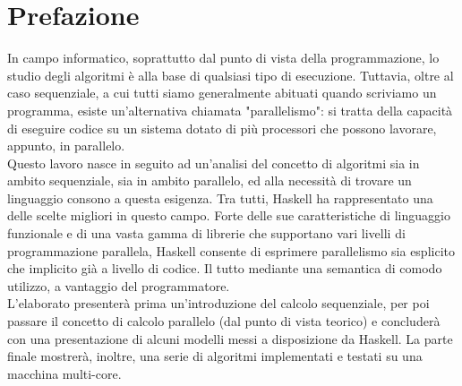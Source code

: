 \chapter*{Prefazione}
In campo informatico, soprattutto dal punto di vista della programmazione, lo studio degli algoritmi è alla base di qualsiasi tipo di esecuzione. Tuttavia, oltre al caso sequenziale, a cui tutti siamo generalmente abituati quando scriviamo un programma, esiste un'alternativa chiamata "parallelismo": si tratta della capacità di eseguire codice su un sistema dotato di più processori che possono lavorare, appunto, in parallelo.\\
Questo lavoro nasce in seguito ad un'analisi del concetto di algoritmi sia in ambito sequenziale, sia in ambito parallelo, ed alla necessità di trovare un linguaggio consono a questa esigenza. Tra tutti, Haskell ha rappresentato una delle scelte migliori in questo campo. Forte delle sue caratteristiche di linguaggio funzionale e di una vasta gamma di librerie che supportano vari livelli di programmazione parallela, Haskell consente di esprimere parallelismo sia esplicito che implicito già a livello di codice. Il tutto mediante una semantica di comodo utilizzo, a vantaggio del programmatore.\\
L'elaborato presenterà prima un'introduzione del calcolo sequenziale, per poi passare il concetto di calcolo parallelo (dal punto di vista teorico) e concluderà con una presentazione di alcuni modelli messi a disposizione da Haskell. La parte finale mostrerà, inoltre, una serie di algoritmi implementati e testati su una macchina multi-core.
